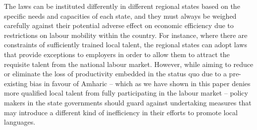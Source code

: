 The laws can be instituted differently in different regional states based on the specific needs and capacities of each state, and they must always be weighed carefully against their potential adverse effect on economic efficiency due to restrictions on labour mobility within the country. For instance, where there are constraints of sufficiently trained local talent, the regional states can adopt laws that provide exceptions to employers in order to allow them to attract the requisite talent from the national labour market. However, while aiming to reduce or eliminate the loss of productivity embedded in the status quo due to a pre-existing bias in favour of Amharic – which as we have shown in this paper denies more qualified local talent from fully participating in the labour market – policy makers in the state governments should guard against undertaking measures that may introduce a different kind of inefficiency in their efforts to promote local languages.
